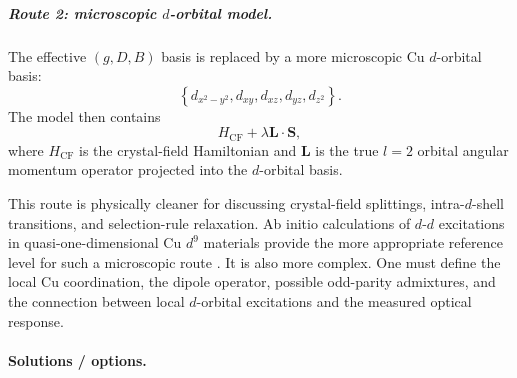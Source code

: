 \documentclass[11pt]{article}
\begin{document}
\subparagraph{Route 2: microscopic \(d\)-orbital model.}

The effective \((g,D,B)\) basis is replaced by a more microscopic Cu \(d\)-orbital basis:
\begin{equation}
\left\{
d_{x^2-y^2},
d_{xy},
d_{xz},
d_{yz},
d_{z^2}
\right\}.
\end{equation}
The model then contains
\begin{equation}
H_{\mathrm{CF}}+\lambda\bm{L}\cdot\bm{S},
\end{equation}
where \(H_{\mathrm{CF}}\) is the crystal-field Hamiltonian and \(\bm{L}\) is the true \(l=2\) orbital angular momentum operator projected into the \(d\)-orbital basis.

This route is physically cleaner for discussing crystal-field splittings, intra-\(d\)-shell transitions, and selection-rule relaxation. Ab initio calculations of \(d\)-\(d\) excitations in quasi-one-dimensional Cu \(d^9\) materials provide the more appropriate reference level for such a microscopic route \cite{Huang2011}. It is also more complex. One must define the local Cu coordination, the dipole operator, possible odd-parity admixtures, and the connection between local \(d\)-orbital excitations and the measured optical response.

\paragraph{Solutions / options.}
\end{document}
